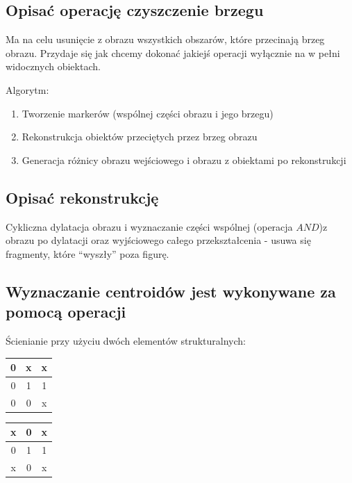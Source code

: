 \documentclass[a4paper, 12pt, titlepage]{article}
\begin{document}
\subsection{Opisać operację czyszczenie brzegu}
Ma na celu usunięcie z obrazu wszystkich obszarów, które przecinają brzeg obrazu. Przydaje się jak chcemy dokonać jakiejś operacji wyłącznie na w pełni widocznych obiektach. \par
Algorytm:
\begin{enumerate}[noitemsep]
	\item Tworzenie markerów (wspólnej części obrazu i jego brzegu)
	\item Rekonstrukcja obiektów przeciętych przez brzeg obrazu
	\item Generacja różnicy obrazu wejściowego i obrazu z obiektami po rekonstrukcji
\end{enumerate}

\subsection{Opisać rekonstrukcję}
Cykliczna dylatacja obrazu i wyznaczanie części wspólnej (operacja $AND$)z obrazu po dylatacji oraz wyjściowego całego przekształcenia - usuwa się fragmenty, które “wyszły” poza figurę.

\subsection{Wyznaczanie centroidów jest wykonywane za pomocą operacji}
Ścienianie przy użyciu dwóch elementów strukturalnych:
\begin{tabular}{|c|c|c|}
	\hline
	0 & x & x \\ \hline
	0 & 1 & 1 \\ \hline
	0 & 0 & x \\ \hline
\end{tabular} 
\begin{tabular}{|c|c|c|}
	\hline
	x & 0 & x \\ \hline
	0 & 1 & 1 \\ \hline
	x & 0 & x \\ \hline
\end{tabular} 

\end{document}
